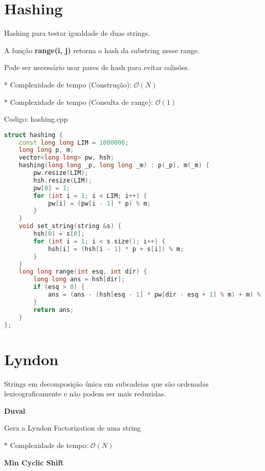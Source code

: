 \documentclass[10pt, a4paper, oneside]{book}
\begin{document}
\section{Hashing}


Hashing para testar igualdade de duas strings.



A função \textbf{range(i, j)} retorna o hash da substring nesse range.   

Pode ser necessário usar pares de hash para evitar colisões.



* Complexidade de tempo (Construção): $\mathcal{O}(N)$

* Complexidade de tempo (Consulta de range): $\mathcal{O}(1)$

\hfill

Codigo: hashing.cpp

\begin{lstlisting}[language=C++]
struct hashing {
    const long long LIM = 1000006;
    long long p, m;
    vector<long long> pw, hsh;
    hashing(long long _p, long long _m) : p(_p), m(_m) {
        pw.resize(LIM);
        hsh.resize(LIM);
        pw[0] = 1;
        for (int i = 1; i < LIM; i++) {
            pw[i] = (pw[i - 1] * p) % m;
        }
    }
    void set_string(string &s) {
        hsh[0] = s[0];
        for (int i = 1; i < s.size(); i++) {
            hsh[i] = (hsh[i - 1] * p + s[i]) % m;
        }
    }
    long long range(int esq, int dir) {
        long long ans = hsh[dir];
        if (esq > 0) {
            ans = (ans - (hsh[esq - 1] * pw[dir - esq + 1] % m) + m) % m;
        }
        return ans;
    }
};
\end{lstlisting}
\hfill

\section{Lyndon}


Strings em decomposição única em subcadeias que são ordenadas lexicograficamente e não podem ser mais reduzidas.



\textbf{Duval} 



Gera a Lyndon Factorization de uma string



* Complexidade de tempo: $\mathcal{O}(N)$



\textbf{Min Cyclic Shift} 
\end{document}
